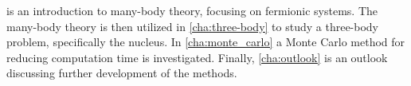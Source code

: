 \documentclass[../main/report.tex]{subfiles}
\begin{document}
 is an introduction to many-body theory, focusing on fermionic systems. 
The many-body theory is then utilized in \cref{cha:three-body} 
to study a three-body problem, specifically the  nucleus.  
In \cref{cha:monte_carlo} a Monte Carlo method for reducing computation time is investigated. 
Finally, \cref{cha:outlook} is an outlook discussing further development of the methods.
\end{document}
